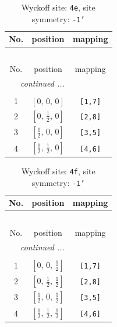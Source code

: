 \documentclass[fleqn,8pt]{jsarticle}
\begin{document}
\begin{longtable}{ccc}
\caption{Wyckoff site: {\tt 4e}, site symmetry: {\tt -1'}}
 \\
 \hline \hline
No. & position & mapping \\ \hline \endfirsthead

\multicolumn{2}{l}{\tablename\ \thetable{}} \\
 \hline \hline
No. & position & mapping \\ \hline \endhead

 \hline \hline
\multicolumn{2}{r}{\footnotesize\it continued ...} \\ \endfoot

 \hline \hline
\multicolumn{2}{r}{} \\ \endlastfoot

1 & $\left[ 0,\, 0,\, 0 \right]$ & {\tt [1,7]} \\ \hline
2 & $\left[ 0,\, \frac{1}{2},\, 0 \right]$ & {\tt [2,8]} \\ \hline
3 & $\left[ \frac{1}{2},\, 0,\, 0 \right]$ & {\tt [3,5]} \\ \hline
4 & $\left[ \frac{1}{2},\, \frac{1}{2},\, 0 \right]$ & {\tt [4,6]} \\
\end{longtable}
\renewcommand{\arraystretch}{1.2}
\begin{longtable}{ccc}
\caption{Wyckoff site: {\tt 4f}, site symmetry: {\tt -1'}}
 \\
 \hline \hline
No. & position & mapping \\ \hline \endfirsthead

\multicolumn{2}{l}{\tablename\ \thetable{}} \\
 \hline \hline
No. & position & mapping \\ \hline \endhead

 \hline \hline
\multicolumn{2}{r}{\footnotesize\it continued ...} \\ \endfoot

 \hline \hline
\multicolumn{2}{r}{} \\ \endlastfoot

1 & $\left[ 0,\, 0,\, \frac{1}{2} \right]$ & {\tt [1,7]} \\ \hline
2 & $\left[ 0,\, \frac{1}{2},\, \frac{1}{2} \right]$ & {\tt [2,8]} \\ \hline
3 & $\left[ \frac{1}{2},\, 0,\, \frac{1}{2} \right]$ & {\tt [3,5]} \\ \hline
4 & $\left[ \frac{1}{2},\, \frac{1}{2},\, \frac{1}{2} \right]$ & {\tt [4,6]} \\
\end{longtable}
\end{document}
